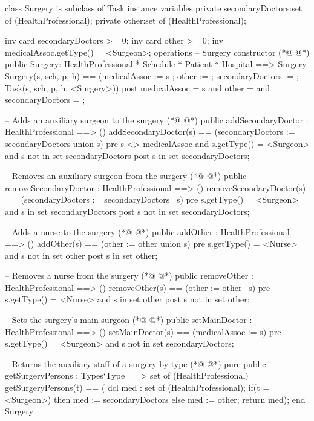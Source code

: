 \begin{vdmpp}[breaklines=true]
class Surgery is subclass of Task
instance variables
  private secondaryDoctors:set of (HealthProfessional);
  private other:set of (HealthProfessional);
  
  inv card secondaryDoctors >= 0;
  inv card other >= 0;
  inv medicalAssoc.getType() = <Surgeon>;
operations
 -- Surgery constructor
(*@
\label{Surgery:11}
@*)
 public Surgery: HealthProfessional * Schedule * Patient * Hospital ==> Surgery
  Surgery(s, sch, p, h) == (medicalAssoc := s ; other := {}; secondaryDoctors := {}; Task(s, sch, p, h, <Surgery>))
 post medicalAssoc = s and other = {} and secondaryDoctors = {};
 
 -- Adds an auxiliary surgeon to the surgery
(*@
\label{addSecondaryDoctor:16}
@*)
 public addSecondaryDoctor : HealthProfessional ==> ()
  addSecondaryDoctor(s) == (secondaryDoctors := secondaryDoctors union {s})
 pre s <> medicalAssoc and s.getType() = <Surgeon> and  s not in set secondaryDoctors
 post s in set secondaryDoctors;
 
 -- Removes an auxiliary surgeon from the surgery
(*@
\label{removeSecondaryDoctor:22}
@*)
 public removeSecondaryDoctor : HealthProfessional ==> ()
  removeSecondaryDoctor(s) == (secondaryDoctors := secondaryDoctors \ {s})
 pre s.getType() = <Surgeon> and s in set secondaryDoctors
 post s not in set secondaryDoctors;
 
 -- Adds a nurse to the surgery
(*@
\label{addOther:28}
@*)
 public addOther : HealthProfessional ==> ()
  addOther(s) == (other := other union {s})
 pre s.getType() = <Nurse> and s not in set other
 post s in set other;
 
 -- Removes a nurse from the surgery
(*@
\label{removeOther:34}
@*)
 public removeOther : HealthProfessional ==> ()
  removeOther(s) == (other := other \ {s})
 pre s.getType() = <Nurse> and s in set other
 post s not in set other;
 
 -- Sets the surgery's main surgeon
(*@
\label{setMainDoctor:40}
@*)
 public setMainDoctor : HealthProfessional ==> ()
  setMainDoctor(s) == (medicalAssoc := s)
 pre s.getType() = <Surgeon> and s not in set secondaryDoctors;
 
 -- Returns the auxiliary staff of a surgery by type
(*@
\label{getSurgeryPersons:45}
@*)
 pure public getSurgeryPersons : Types`Type ==> set of (HealthProfessional)
  getSurgeryPersons(t) == (
               dcl med : set of (HealthProfessional);
               if(t = <Surgeon>)
                then med := secondaryDoctors
               else
                med := other;
               return med);
end Surgery
\end{vdmpp}
